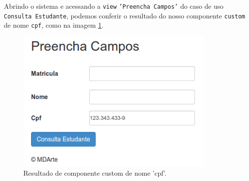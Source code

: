 Abrindo o sistema e acessando a \texttt{view} \texttt{'Preencha Campos'} do caso
de uso \texttt{Consulta Estudante}, podemos conferir o resultado do nosso
componente \texttt{custom} de nome \texttt{cpf}, como na imagem
\ref{parametro_cpf_custom_exemplo}.
\begin{figure}[H]
	\centering
	\includegraphics[width=280pt,height=200pt]{files/imgs/tutorial-mdarte-0035.png}
	\caption{Resultado de componente custom de nome 'cpf'.}
	\label{parametro_cpf_custom_exemplo}
\end{figure}